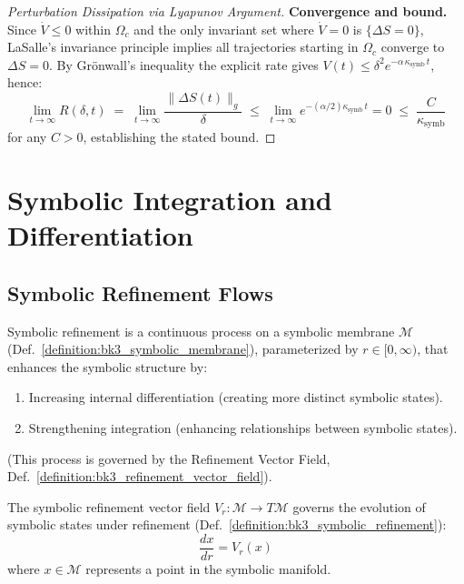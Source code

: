 \begin{proof}[Perturbation Dissipation via Lyapunov Argument]
\textbf{Convergence and bound.}
Since $\dot{V} \leq 0$ within $\Omega_c$ and the only invariant set where
$\dot{V} = 0$ is $\{\Delta S = 0\}$, LaSalle's invariance principle implies
all trajectories starting in $\Omega_c$ converge to $\Delta S = 0$.
By Gr\"{o}nwall's inequality the explicit rate gives
$V(t) \leq \delta^2 e^{-\alpha\,\kappa_{\text{symb}}\,t}$, hence:
\[
\lim_{t \to \infty} R(\delta, t)
\;=\; \lim_{t \to \infty} \frac{\|\Delta S(t)\|_g}{\delta}
\;\leq\; \lim_{t \to \infty} e^{-(\alpha/2)\kappa_{\text{symb}}\,t} = 0
\;\leq\; \frac{C}{\kappa_{\text{symb}}}
\]
for any $C > 0$, establishing the stated bound.
\end{proof}

\section{Symbolic Integration and Differentiation}
\label{sec:bk3_symbolic_integration_differentiation}
\subsection{Symbolic Refinement Flows}

\begin{definition} \label{definition:bk3_symbolic_refinement}
Symbolic refinement is a continuous process on a symbolic membrane $\mathcal{M}$ (Def.~\ref{definition:bk3_symbolic_membrane}), parameterized by $r \in [0, \infty)$, that enhances the symbolic structure by:
\begin{enumerate}
    \item Increasing internal differentiation (creating more distinct symbolic states).
    \item Strengthening integration (enhancing relationships between symbolic states).
\end{enumerate}
(This process is governed by the Refinement Vector Field, Def.~\ref{definition:bk3_refinement_vector_field}).
\end{definition}

\begin{definition} \label{definition:bk3_refinement_vector_field}
The symbolic refinement vector field $V_r: \mathcal{M} \rightarrow T\mathcal{M}$ governs the evolution of symbolic states under refinement (Def.~\ref{definition:bk3_symbolic_refinement}):
\[
\frac{dx}{dr} = V_r(x)
\]
where $x \in \mathcal{M}$ represents a point in the symbolic manifold.
\end{definition}


